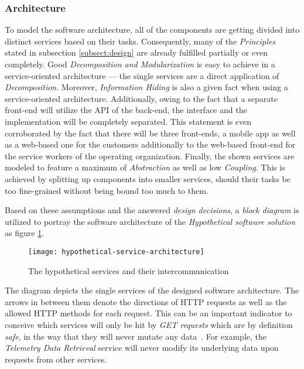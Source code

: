\documentclass[12pt,a4paper]{report}
\begin{document}
\subsubsection{Architecture}

To model the software architecture, all of the components are getting divided
into distinct services based on their tasks. Consequently, many of the
\textit{Principles} stated in subsection \ref{subsect:design} are already fulfilled
partially or even completely. Good \textit{Decomposition and Modularization} is
easy to achieve in a service-oriented architecture --- the single services
are a direct application of \textit{Decomposition}.
Moreover, \textit{Information Hiding} is also a given fact when using a
service-oriented architecture.
Additionally, owing to the fact that a separate front-end will utilize the API
of the back-end, the interface and the implementation will be completely separated.
This statement is even corroborated by the fact that there will be three front-ends,
a mobile app as well as a web-based one for the customers additionally to the
web-based front-end for the service workers of the operating organization.
Finally, the shown services are modeled to feature a maximum of \textit{Abstraction}
as well as low \textit{Coupling}. This is achieved by splitting up components
into smaller services, should their tasks be too fine-grained without being
bound too much to them.

Based on these assumptions and the answered \textit{design decisions},
a \textit{block diagram} is utilized to portray the software architecture of the
\textit{Hypothetical software solution} as figure \ref{fig:hypothetical-service-architecture}.\\

\begin{figure}[htbp]
\centering
\texttt{[image: hypothetical-service-architecture]}
\caption{The hypothetical services and their intercommunication}
\label{fig:hypothetical-service-architecture}
\end{figure}

The diagram depicts the single services of the designed software architecture.
The arrows in between them denote the directions of HTTP requests as well
as the allowed HTTP methods for each request.
This can be an important indicator to conceive which services
will only be hit by \textit{GET requests} which are by definition \textit{safe},
in the way that they will never mutate any data~\cite{http-rfc}.
For example, the \textit{Telemetry Data Retrieval} service will never modify
its underlying data upon requests from other services.
\end{document}
